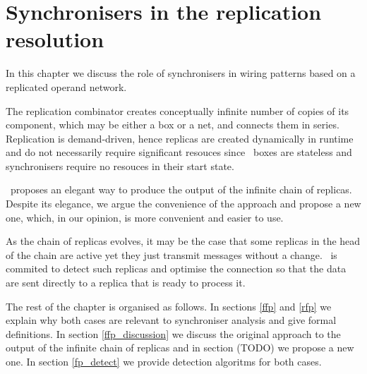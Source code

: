 \chapter{Synchronisers in the replication resolution}

In this chapter we discuss the role of synchronisers in wiring patterns based on a replicated operand network.

The replication combinator creates conceptually infinite number of copies of its component, which may be either a box or a net, and connects them in series. Replication is demand-driven, hence replicas are created dynamically in runtime and do not necessarily require significant resouces since \ak\ boxes are stateless and synchronisers require no resouces in their start state.

\ak\ proposes an elegant way to produce the output of the infinite chain of replicas. Despite its elegance, we argue the convenience of the approach and propose a new one, which, in our opinion, is more convenient and easier to use.

As the chain of replicas evolves, it may be the case that some replicas in the head of the chain are active yet they just transmit messages without a change. \ak\ is commited to detect such replicas and optimise the connection so that the data are sent directly to a replica that is ready to process it. 

The rest of the chapter is organised as follows. In sections \ref{ffp} and \ref{rfp} we explain why both cases are relevant to synchroniser analysis and give formal definitions. In section \ref{ffp_discussion} we discuss the original approach to the output of the infinite chain of replicas and in section (TODO) we propose a new one. In section \ref{fp_detect} we provide detection algoritms for both cases.







